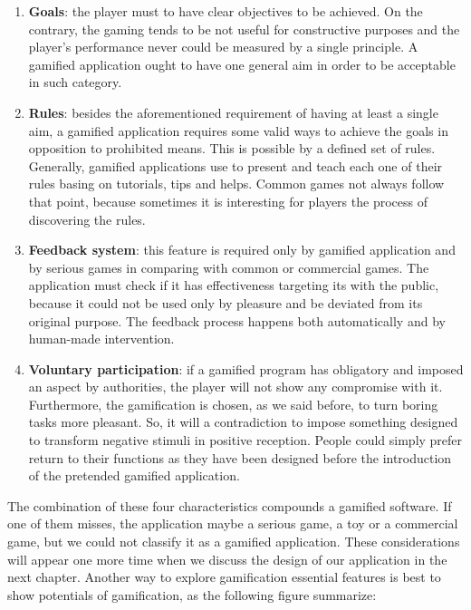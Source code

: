 \begin{enumerate}
\item  \textbf{Goals}: the player must to have clear objectives to be achieved. On the contrary, the gaming tends to be not useful for constructive purposes and the player's performance never could be measured by a single principle. A gamified application ought to have one general aim in order to be acceptable in such category.
\item \textbf{Rules}: besides the aforementioned requirement of having at least a single aim, a gamified application requires some valid ways to achieve the goals in opposition to prohibited means. This is possible by a defined set of rules. Generally, gamified applications use to present and teach each one of their rules basing on tutorials, tips and helps. Common games not always follow that point, because sometimes it is interesting for players the process of discovering the rules.
\item \textbf{Feedback system}: this feature is required only by gamified  application and by serious games in comparing with common or commercial games. The application must check if it has effectiveness targeting its with the public, because it could not be used only by pleasure and be deviated from its original purpose. The feedback process happens both  automatically and by human-made intervention.
\item \textbf{Voluntary participation}: if a gamified program has obligatory and imposed an aspect  by authorities, the player will not show any compromise with it. Furthermore, the gamification is chosen, as we said before, to turn boring tasks more pleasant. So, it will a contradiction to impose something designed to transform negative stimuli in positive reception. People could simply prefer return to their functions as they have been designed before the introduction of the pretended gamified application.
\end{enumerate}

The combination of these four characteristics compounds a gamified software. If one of them misses, the application maybe a serious game, a toy or a commercial game, but we could not classify it as a gamified application. These considerations will appear one more time when we discuss the design of our application in the next chapter. Another way to explore gamification essential features is best to show potentials of gamification, as the following figure summarize:

